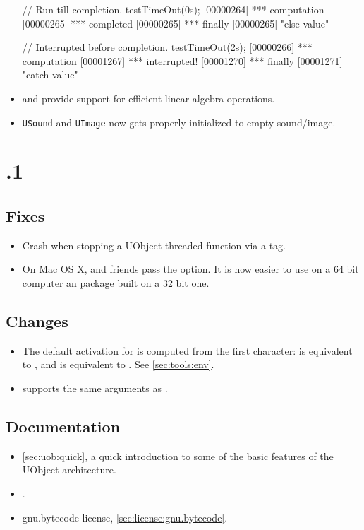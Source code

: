 \begin{itemize}
\begin{urbiscript}
// Run till completion.
testTimeOut(0s);
[00000264] *** computation
[00000265] *** completed
[00000265] *** finally
[00000265] "else-value"

// Interrupted before completion.
testTimeOut(2s);
[00000266] *** computation
[00001267] *** interrupted!
[00001270] *** finally
[00001271] "catch-value"
\end{urbiscript}

\item {} and  provide support for
  efficient linear algebra operations.

\item \lstinline|USound| and \lstinline|UImage| now gets properly
  initialized to empty sound/image.

\end{itemize}

\section{.1}

\subsection{Fixes}
\begin{itemize}
\item Crash when stopping a UObject threaded function via a tag.
\item On Mac OS X,  and friends pass the  option.
  It is now easier to use on a 64 bit computer an \usdk package built on a
  32 bit one.
\end{itemize}

\subsection{Changes}
\begin{itemize}
\item The default activation for  is computed from the
  first character:  is equivalent to
  , and  is equivalent to
  .  See \autoref{sec:tools:env}.
\item {} supports the same arguments as
  .
\end{itemize}

\subsection{Documentation}
\begin{itemize}
\item \autoref{sec:uob:quick}, a quick introduction to some of the basic
  features of the UObject architecture.
\item {}.
\item gnu.bytecode license, \autoref{sec:license:gnu.bytecode}.
\end{itemize}

